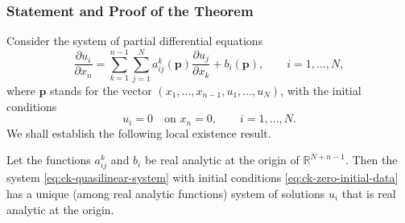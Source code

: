 \subsubsection{Statement and Proof of the Theorem}\label{subsec:ck-statement-proof}

Consider the system of partial differential equations
\begin{equation}\label{eq:ck-quasilinear-system}
\dfrac{\partial u_i}{\partial x_n}=\sum_{k=1}^{n-1}\sum_{j=1}^Na_{ij}^k(\bm{p})\dfrac{\partial u_j}{\partial x_k}+b_i(\bm{p}),\qquad i=1,\ldots,N,
\end{equation}
where $\bm{p}$ stands for the vector $(x_1,\ldots,x_{n-1},u_1,\ldots,u_N)$, with the initial conditions
\begin{equation}\label{eq:ck-zero-initial-data}
u_i=0\quad\text{on }x_n=0,\qquad i=1,\ldots,N.
\end{equation}
We shall establish the following local existence result.

\begin{Theorem}
\label{thm:cauchy-kovalevskaya-local-existence}
Let the functions $a_{ij}^k$ and $b_i$ be real analytic at the origin of $\mathbb{R}^{N+n-1}$. Then the system \eqref{eq:ck-quasilinear-system} with initial conditions \eqref{eq:ck-zero-initial-data} has a unique (among real analytic functions) system of solutions $u_i$ that is real analytic at the origin.
\end{Theorem}

